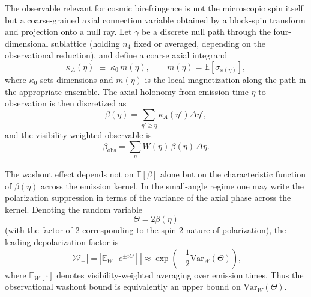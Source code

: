 \documentclass[12pt]{article}
\begin{document}
The observable relevant for cosmic birefringence is not the microscopic spin itself but a coarse-grained axial connection variable obtained by a block-spin transform and projection onto a null ray. Let $\gamma$ be a discrete null path through the four-dimensional sublattice (holding $n_4$ fixed or averaged, depending on the observational reduction), and define a coarse axial integrand
\begin{equation}
\kappa_A(\eta)
\;\equiv\;
\kappa_0 \, m(\eta),
\qquad
m(\eta)
=
\mathbb{E}\!\left[\sigma_{x(\eta)}\right],
\end{equation}
where $\kappa_0$ sets dimensions and $m(\eta)$ is the local magnetization along the path in the appropriate ensemble. The axial holonomy from emission time $\eta$ to observation is then discretized as
\begin{equation}
\beta(\eta)
=
\sum_{\eta' \ge \eta}
\kappa_A(\eta') \Delta\eta',
\end{equation}
and the visibility-weighted observable is
\begin{equation}
\beta_{\mathrm{obs}}
=
\sum_{\eta}
W(\eta)\,\beta(\eta)\,\Delta\eta.
\end{equation}

The washout effect depends not on $\mathbb{E}[\beta]$ alone but on the characteristic function of $\beta(\eta)$ across the emission kernel. In the small-angle regime one may write the polarization suppression in terms of the variance of the axial phase across the kernel. Denoting the random variable
\begin{equation}
\Theta
=
2\beta(\eta)
\end{equation}
(with the factor of $2$ corresponding to the spin-2 nature of polarization), the leading depolarization factor is
\begin{equation}
\left|\mathcal{W}_\pm\right|
=
\left|\mathbb{E}_W\!\left[e^{\pm i\Theta}\right]\right|
\approx
\exp\!\left(-\frac{1}{2}\mathrm{Var}_W(\Theta)\right),
\end{equation}
where $\mathbb{E}_W[\cdot]$ denotes visibility-weighted averaging over emission times. Thus the observational washout bound is equivalently an upper bound on $\mathrm{Var}_W(\Theta)$.
\end{document}

